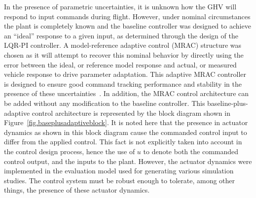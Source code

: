 In the presence of parametric uncertainties, it is unknown how the GHV will respond to input commands during flight.
However, under nominal circumstances the plant is completely known and the baseline controller was designed to achieve an ``ideal'' response to a given input, as determined through the design of the LQR-PI controller.
A model-reference adaptive control (MRAC) structure was chosen as it will attempt to recover this nominal behavior by directly using the error between the ideal, or reference model response and actual, or measured vehicle response to drive parameter adaptation.
This adaptive MRAC controller is designed to ensure good command tracking performance and stability in the presence of these uncertainties\ \cite{book.astrom.1989,slotine.appliednonlinear.1991,narendra.stable.2005}.
In addition, the MRAC control architecture can be added without any modification to the baseline controller.
This baseline-plus-adaptive control architecture is represented by the block diagram shown in Figure~\ref{fig.baseplusadaptiveblock}.
It is noted here that the presence in actuator dynamics as shown in this block diagram cause the commanded control input to differ from the applied control.
This fact is not explicitly taken into account in the control design process, hence the use of $u$ to denote both the commanded control output, and the inputs to the plant.
However, the actuator dynamics were implemented in the evaluation model used for generating various simulation studies.
The control system must be robust enough to tolerate, among other things, the presence of these actuator dynamics.

